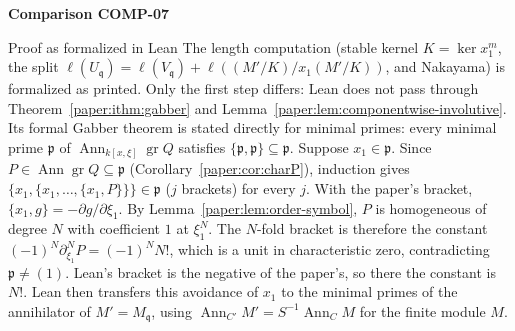 \documentclass[11pt]{amsart}
\numberwithin{equation}{section}
\theoremstyle{plain}
\theoremstyle{remark}
\newcommand{\gr}{\operatorname{gr}}
\newcommand{\Ann}{\operatorname{Ann}}
\begin{document}
\par\bigskip\noindent{}\hypertarget{comparison-COMP-07}{\textbf{Comparison COMP-07}}\label{comparison-COMP-07}\par\smallskip
{}
\begin{AIaddition}{Proof as formalized in Lean}
The length computation (stable kernel $K=\ker x_1^m$, the split
$\ell(U_{\mathfrak q})=\ell(V_{\mathfrak q})+\ell((M'/K)/x_1(M'/K))$, and
Nakayama) is formalized as printed. Only the first step differs: Lean does
not pass through Theorem~\ref{paper:ithm:gabber} and
Lemma~\ref{paper:lem:componentwise-involutive}. Its formal Gabber theorem is stated
directly for minimal primes: every minimal prime $\mathfrak p$ of
$\Ann_{k[x,\xi]}\gr Q$ satisfies $\{\mathfrak p,\mathfrak p\}\subseteq\mathfrak p$.
Suppose $x_1\in\mathfrak p$. Since $P\in\Ann\gr Q\subseteq\mathfrak p$
(Corollary~\ref{paper:cor:charP}), induction gives
$\{x_1,\{x_1,\ldots,\{x_1,P\}\}\}\in\mathfrak p$ ($j$ brackets) for every $j$.
With the paper's bracket, $\{x_1,g\}=-\partial g/\partial\xi_1$. By
Lemma~\ref{paper:lem:order-symbol}, $P$ is homogeneous of degree $N$ with
coefficient $1$ at $\xi_1^N$. The $N$-fold bracket is therefore the constant
$(-1)^N\partial^N_{\xi_1}P=(-1)^NN!$, which is a unit in characteristic zero,
contradicting $\mathfrak p\neq(1)$. Lean's bracket is the negative of the
paper's, so there the constant is $N!$. Lean then transfers this avoidance
of $x_1$ to the minimal primes of the annihilator of $M'=M_{\mathfrak q}$,
using $\Ann_{C'}M'=S^{-1}\Ann_CM$ for the finite module $M$.
\end{AIaddition}
\end{document}
